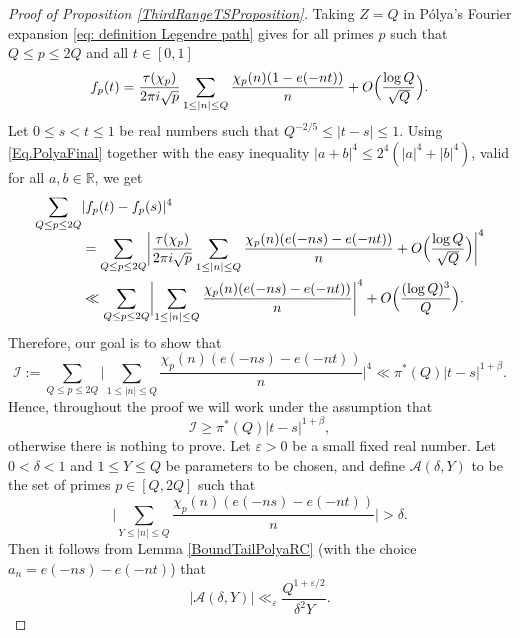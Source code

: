 \documentclass[JEP,XML,SOM,Unicode,NoFloatCountersInSection,published]{cedram}
\theoremstyle{plain}
\theoremstyle{definition}
\let\ep\varepsilon
\begin{document}
\begin{proof}[Proof of Proposition \ref{ThirdRangeTSProposition}]
Taking $Z=Q$ in Pólya's Fourier expansion \eqref{eq: definition Legendre path} gives for all primes $p$ such that $Q\leq p\leq 2Q$ and all $t\in [0, 1]$\vspace*{-3pt}
\begin{equation}\label{Eq.PolyaFinal}
f_p(t)= \frac{\tau(\chi_p)}{2\pi i\sqrt{p}}\sum_{1\leq |n|\leq Q} \frac{\chi_p(n) (1-e(-nt))}{n} +O\Bigl(\frac{\log Q}{\sqrt{Q}}\Bigr).
\end{equation}
Let $0\leq s<t\leq 1$ be real numbers such that $Q^{-2/5}\leq |t-s|\leq 1$. Using \eqref{Eq.PolyaFinal} together with the easy inequality $|a+b|^{4} \leq 2^{4}(|a|^{4}+|b|^{4})$, valid for all $a, b\in \mathbb{R}$, we get\vspace*{-3pt}
\begin{equation}
\begin{aligned}\label{InequalityI}
\sum_{Q\leq p\leq 2Q}& |f_p(t)-f_p(s)|^4\\[-5pt]
&= \sum_{Q\leq p\leq 2Q} \biggl|\frac{\tau(\chi_p)}{2\pi i\sqrt{p}}\sum_{1\leq |n|\leq Q} \frac{\chi_p(n) (e(-ns)-e(-nt))}{n} +O\Bigl(\frac{\log Q}{\sqrt{Q}}\Bigr)\biggr|^4\\
&\ll \sum_{Q\leq p\leq 2Q} \biggl|\sum_{1\leq |n|\leq Q} \frac{\chi_p(n) (e(-ns)-e(-nt))}{n} \biggr|^4+ O\Bigl(\frac{(\log Q)^3}{Q}\Bigr).
\end{aligned}
\end{equation}
Therefore, our goal is to show that\vspace*{-3pt}
\[
\mathcal{I}:= \sum_{Q\leq p\leq 2Q} \biggl|\sum_{1\leq |n|\leq Q} \frac{\chi_p(n) (e(-ns)-e(-nt))}{n} \biggr|^4\ll \pi^*(Q) |t-s|^{1+\beta}.\] Hence, throughout the proof we will work under the assumption that\vspace*{-3pt}
\begin{equation}\label{Eq.AssumptionI}
\mathcal{I}\geq \pi^*(Q) |t-s|^{1+\beta},
\end{equation} otherwise there is nothing to prove.
Let $\ep>0$ be a small fixed real number. Let $0<\delta<1$ and $1\leq Y\leq Q$ be parameters to be chosen, and define $\mathcal{A}(\delta, Y)$ to be the set of primes $p\in [Q, 2Q]$ such that\vspace*{-3pt}
\[
\biggl|\sum_{Y\leq |n|\leq Q} \frac{\chi_p(n) (e(-ns)-e(-nt))}{n}\biggr| >\delta.\]
Then it follows from Lemma \ref{BoundTailPolyaRC} (with the choice $a_n=e(-ns)-e(-nt)$)
that\vspace*{-3pt}
\begin{equation}\label{ConsequenceLemma4.5}
|\mathcal{A}(\delta, Y)|\ll_{\ep} \frac{Q^{1+\ep/2}}{\delta^2 Y}.

\end{equation}
\end{proof}
\end{document}

